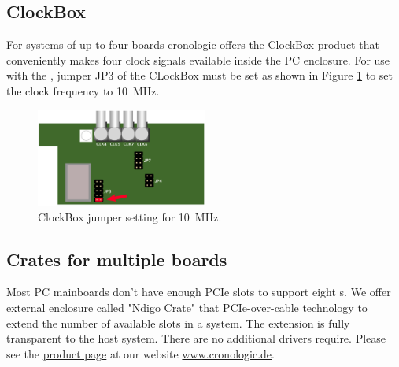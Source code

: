{		\subsection{ClockBox}
			For systems of up to four boards cronologic offers the ClockBox product that conveniently makes four clock signals evailable 
			inside the PC enclosure. For use with the \deviceName, jumper JP3 of the CLockBox must be set as shown in Figure \ref{fig:clockbox} to set the clock frequency to 10~MHz. 
			\begin{figure}[ht]
				\begin{center}
					\includegraphics[width=0.5\textwidth]{xhptdc/figures/clockbox.pdf}				
					\caption{ClockBox jumper setting for 10~MHz.\label{fig:clockbox}}
				\end{center} 
			\end{figure}
		
		\subsection{Crates for multiple boards}
			Most PC mainboards don't have enough PCIe slots to support eight \deviceName s. 
			We offer external enclosure called "Ndigo Crate" that PCIe-over-cable technology to extend the number of available slots in a system.
			The extension is fully transparent to the host system. There are no additional drivers require. 
			Please see the \href{https://www.cronologic.de/products/pcie/pcie-crates}{product page} at our website \url{www.cronologic.de}.  
		

	

}{}




	


